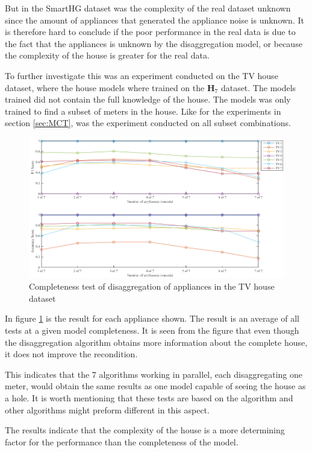But in the SmartHG dataset was the complexity of the real dataset unknown since the amount of appliances that generated the appliance noise is unknown. It is therefore hard to conclude if the poor performance in the real data is due to the fact that the appliances is unknown by the disaggregation model, or because the complexity of the house is greater for the real data. 

To further investigate this was an experiment conducted on the TV house dataset, where the house models where trained on the $\textbf{H}_{7}$ dataset. The models trained did not contain the full knowledge of the house. The models was only trained to find a subset of meters in the house. Like for the experiments in section \ref{sec:MCT}, was the experiment conducted on all subset combinations. 

\begin{figure}[H]
\centering
\includegraphics[width=1\textwidth]{billeder/ModelCompletness.png}
\caption{Completeness test of disaggregation of appliances in the TV house dataset }
\label{fig:COD}
\end{figure}

In figure \ref{fig:COD} is the result for each appliance shown. The result is an average of all tests at a given model completeness. It is seen from the figure that even though the disaggregation algorithm obtains more information about the complete house, it does not improve the recondition. 

This indicates that the 7 algorithms working in parallel, each disaggregating one meter, would obtain the same results as one model capable of seeing the house as a hole. It is worth mentioning that these tests are based on the  algorithm and other algorithms might preform different in this aspect. 

The results indicate that the complexity of the house is a more determining factor for the performance than the completeness of the model. 

